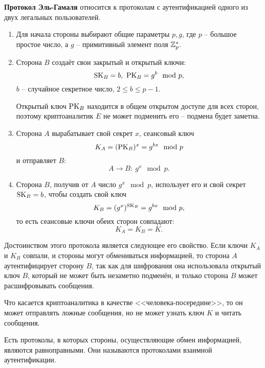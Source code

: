 \textbf{Протокол Эль-Гамаля} относится к протоколам с аутентификацией одного из двух легальных пользователей.
\begin{enumerate}
    \item Для начала стороны выбирают общие параметры $p, g$, где $p$ -- большое простое число, а $g$ -- примитивный элемент поля $\mathbb{Z}_p^*$.
    \item Сторона $B$ создаёт свои закрытый и открытый ключи:
            \[ \textrm{SK}_B = b, ~ \textrm{PK}_B = g^b \mod p, \]
        $b$ -- случайное секретное число, $2 \leq b \leq p-1$.

        Открытый ключ $\textrm{PK}_B$ находится в общем открытом доступе для всех сторон, поэтому криптоаналитик $E$ не может подменить его -- подмена будет заметна.
    \item Сторона $A$ вырабатывает свой секрет $x$, сеансовый ключ
            \[ K_A = (\textrm{PK}_B)^x = g^{bx} \mod p \]
        и отправляет $B$:
            \[ A \rightarrow B: ~ g^x \mod p. \]
    \item Сторона $B$, получив от $A$ число $g^x \mod p$, использует его и свой секрет $\textrm{SK}_B = b$, чтобы создать свой ключ
            \[ K_B = (g^x)^{\textrm{SK}_B} = g^{bx} \mod p, \]
        то есть сеансовые ключи обеих сторон совпадают:
            \[ K_A = K_B = K. \]
\end{enumerate}

Достоинством этого протокола является следующее его свойство. Если ключи $K_A$ и $K_B$ совпали, и стороны могут обмениваться информацией, то сторона $A$ аутентифицирует сторону $B$, так как для шифрования она использовала открытый ключ $B$, который не может быть незаметно подменён, и только сторона $B$ может расшифровывать сообщения.

Что касается криптоаналитика в качестве <<человека-посередине>>, то он может отправлять ложные сообщения, но не может узнать ключ $K$ и читать сообщения.

Есть протоколы, в которых стороны, осуществляющие обмен информацией, являются равноправными. Они называются протоколами взаимной аутентификации.
